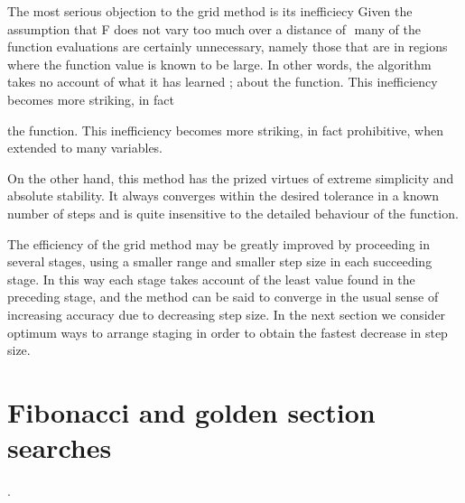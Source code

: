      The most serious objection to the grid method is its inefficiecy
Given the assumption that F does not vary too much over a distance
of $ $
many of the function evaluations are certainly unnecessary, namely those
that are in regions where the function value is known to be large. In
other words, the algorithm takes no account of what it has learned ;
about the function.  This inefficiency becomes more striking, in fact
 
the function.  This inefficiency becomes more striking, in fact
prohibitive, when extended to many variables.
 
     On the other hand, this method has the prized virtues of extreme
simplicity and absolute stability.  It always converges within the
desired tolerance in a known number of steps and is quite insensitive
to the detailed behaviour of the function.
 
     The efficiency of the grid method may be greatly improved by
proceeding in several stages, using a smaller range and smaller step
size in each succeeding stage.  In this way each stage takes account of
the least value found in the preceding stage, and the method can be said
to converge in the usual sense of increasing accuracy due to decreasing
step size.  In the next section we consider optimum ways to arrange
staging in order to obtain the fastest decrease in step size.
 
 
\section{Fibonacci and golden section searches}
 .
 
